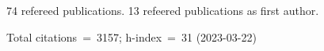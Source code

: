 74 refereed publications. 13 refeered publications as first author.

Total citations~=~3157; h-index~=~31 (2023-03-22)